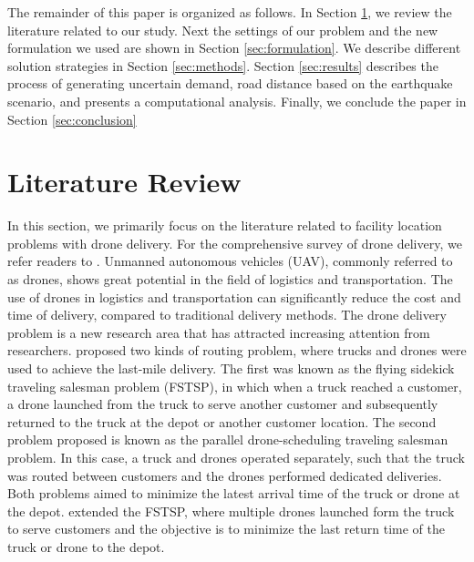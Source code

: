 \documentclass[preprint,review,11pt,authoryear]{elsarticle}
\begin{document}
The remainder of this paper is organized as follows. In Section \ref*{sec:Review}, we review the literature related to our study. Next the settings of our problem and the new formulation we used are shown in Section \ref*{sec:formulation}. We describe different solution strategies in Section \ref*{sec:methods}. Section \ref*{sec:results} describes the process of generating uncertain demand, road distance based on the earthquake scenario, and presents a computational analysis. Finally, we conclude the paper in Section \ref*{sec:conclusion}

\section{Literature Review}\label{sec:Review}
In this section, we primarily focus on the literature related to facility location problems with drone delivery. For the comprehensive survey of drone delivery, we refer readers to \cite{dukkanci2023facility}. Unmanned autonomous vehicles (UAV), commonly referred to as drones, shows great potential in the field of logistics and transportation. The use of drones in logistics and transportation can significantly reduce the cost and time of delivery, compared to traditional delivery methods. The drone delivery problem is a new research area that has attracted increasing attention from researchers. \cite{murray2015flying} proposed two kinds of routing problem, where trucks and drones were used to achieve the last-mile delivery. The first was known as the flying sidekick traveling salesman problem (FSTSP), in which when a truck reached a customer, a drone launched from the truck to serve another customer and subsequently returned to the truck at the depot or another customer location. The second problem proposed is known as the parallel drone-scheduling traveling salesman problem. In this case, a truck and drones operated separately, such that the truck was routed between customers and the drones performed dedicated deliveries. Both problems aimed to minimize the latest arrival time of the truck or drone at the depot. \cite{murray2020multiple} extended the FSTSP, where multiple drones launched form the truck to serve customers and the objective is to minimize the last return time of the truck or drone to the depot. 
\end{document}
